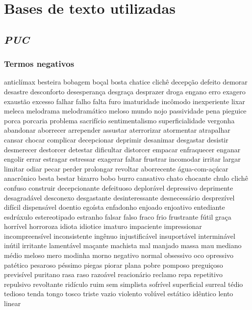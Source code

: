 \chapter{Bases de texto utilizadas}

\section{\textit{PUC}}
\subsection{Termos negativos}
anticl\'{i}max besteira bobagem bo\c{c}al bosta chatice clich\^{e} decep\c{c}\~ao defeito demorar desastre desconforto desesperan\c{c}a desgra\c{c}a desprazer droga engano erro exagero exaust\~ao excesso falhar falho falta furo imaturidade inc\^{o}modo inexperiente lixar meleca melodrama melodram\'{a}tico meloso mundo nojo passividade pena pieguice porca porcaria problema sacrif\'{i}cio sentimentalismo superficialidade vergonha abandonar aborrecer arrepender assustar aterrorizar atormentar atrapalhar cansar chocar complicar decepcionar deprimir desanimar desgastar desistir desmerecer destorcer detestar dificultar distorcer empacar enfraquecer enganar engolir errar estragar estressar exagerar faltar frustrar incomodar irritar largar limitar odiar pecar perder prolongar revoltar aborrecente \'{a}gua-com-a\c{c}\'{u}car anacr\^{o}nico besta bestar bizarro bobo burro cansativo chato chocante chulo clich\^{e} confuso construir decepcionante defeituoso deplor\'{a}vel depressivo deprimente desagrad\'{a}vel desconexo desgastante desinteressante desnecess\'{a}rio desprez\'{i}vel dif\'{i}cil dispens\'{a}vel doentio ego\'{i}sta enfadonho enjoado enjoativo entediante esdr\'{u}xulo estereotipado estranho falsar falso fraco frio frustrante f\'{u}til gra\c{c}a horr\'{i}vel horroroza idiota idiotice imaturo impaciente impressionar incompreens\'{i}vel inconsistente ing\^{e}nuo injustific\'{a}vel insuport\'{a}vel intermin\'{a}vel in\'{u}til irritante lament\'{a}vel ma\c{c}ante machista mal manjado massa mau mediano m\'{e}dio meloso mero modinha morno negativo normal obsessivo oco opressivo pat\'{e}tico pesaroso p\'{e}ssimo piegas piorar plana pobre pomposo pregui\c{c}oso previs\'{i}vel puritano rasa raso razo\'{a}vel reacion\'{a}rio reclamo repa repetitivo repulsivo revoltante rid\'{i}culo ruim sem simplista sofr\'{i}vel superficial surreal t\'{e}dio tedioso tenda tongo tosco triste vazio violento vol\'{u}vel est\'{a}tico id\^{e}ntico lento linear 

